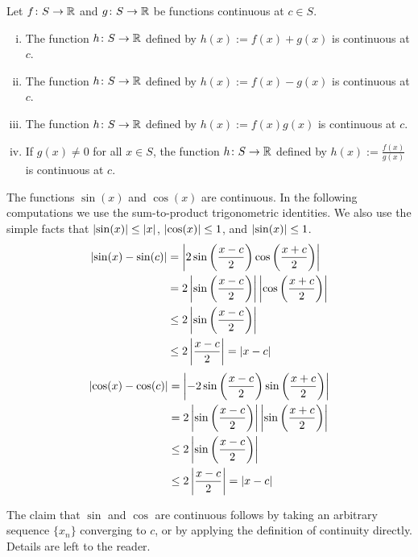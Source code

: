 \begin{prop} \label{contalg:prop}
Let $f \colon S \to {\mathbb{R}}$ and $g \colon S \to {\mathbb{R}}$ be functions
continuous at $c \in S$.
\begin{enumerate}[(i)]
\item The function $h \colon S \to {\mathbb{R}}$ defined by
$h(x) := f(x)+g(x)$ is continuous at $c$.
\item The function $h \colon S \to {\mathbb{R}}$ defined by
$h(x) := f(x)-g(x)$ is continuous at $c$.
\item The function $h \colon S \to {\mathbb{R}}$ defined by
$h(x) := f(x)g(x)$ is continuous at $c$.
\item If $g(x)\not=0$ for all $x \in S$, the function $h \colon S \to {\mathbb{R}}$
defined by $h(x) := \frac{f(x)}{g(x)}$ is continuous at $c$.
\end{enumerate}
\end{prop}

\begin{example} \label{sincos:example}
The functions $\sin(x)$ and $\cos(x)$ are continuous.
In the following computations we use the sum-to-product
trigonometric identities.  We also use the simple facts that
$\left\lvert {\sin(x)} \right\rvert \leq \left\lvert {x} \right\rvert$, $\left\lvert {\cos(x)} \right\rvert \leq 1$,
and $\left\lvert {\sin(x)} \right\rvert \leq 1$.
\begin{equation*}
\begin{split}
\left\lvert {\sin(x)-\sin(c)} \right\rvert & =
\left\lvert {
2 \sin \left( \frac{x-c}{2} \right) \cos \left( \frac{x+c}{2} \right)
} \right\rvert
\\
& =
2
\left\lvert { \sin \left( \frac{x-c}{2} \right) } \right\rvert
\left\lvert { \cos \left( \frac{x+c}{2} \right) } \right\rvert
\\
& \leq
2
\left\lvert { \sin \left( \frac{x-c}{2} \right) } \right\rvert
\\
& \leq
2
\left\lvert { \frac{x-c}{2} } \right\rvert
= \left\lvert {x-c} \right\rvert
\end{split}
\end{equation*}
\begin{equation*}
\begin{split}
\left\lvert {\cos(x)-\cos(c)} \right\rvert & =
\left\lvert {
-2 \sin \left( \frac{x-c}{2} \right) \sin \left( \frac{x+c}{2} \right)
} \right\rvert
\\
& =
2
\left\lvert { \sin \left( \frac{x-c}{2} \right) } \right\rvert
\left\lvert { \sin \left( \frac{x+c}{2} \right) } \right\rvert
\\
& \leq
2
\left\lvert { \sin \left( \frac{x-c}{2} \right) } \right\rvert
\\
& \leq
2
\left\lvert { \frac{x-c}{2} } \right\rvert
= \left\lvert {x-c} \right\rvert
\end{split}
\end{equation*}

The claim that $\sin$ and $\cos$ are continuous follows by taking an
arbitrary sequence $\{ x_n \}$ converging to $c$, or by applying the
definition of continuity directly.  Details are left to the
reader.
\end{example}

